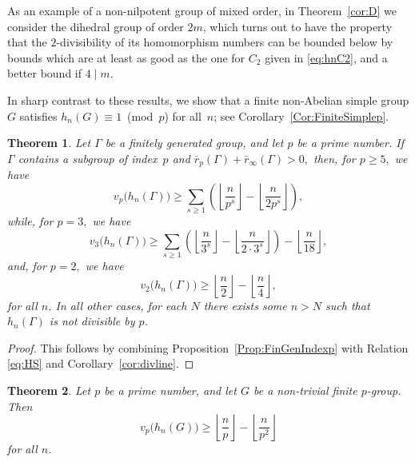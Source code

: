 \documentclass[12pt,reqno]{amsart}
\numberwithin{equation}{section}
\newtheorem{theorem}{Theorem}
\theoremstyle{remark}
\begin{document}
As an example of a non-nilpotent group of mixed order, in
Theorem~\ref{cor:D} we consider the dihedral group of order $2m$,
which turns out to have the property that the $2$-divisibility of
its homomorphism numbers can be bounded below by bounds which are
at least as good as the one for $C_2$ given in \eqref{eq:hnC2},
and a better bound if $4\mid m$.

In sharp contrast to these results, we show that a finite non-Abelian simple
group $G$ satisfies $h_n(G)\equiv 1$~(mod~$p$) for
all~$n$; see Corollary~\ref{Cor:FiniteSimplep}. 

\begin{theorem} \label{thm:fingen}
Let\/ $\Gamma$ be a finitely generated group, and let $p$ be a prime number.
If $\Gamma$ contains a subgroup of index~$p$ and
$\bar{r}_p(\Gamma) + \bar{r}_\infty(\Gamma)
>0,$ then, for $p\ge5,$ we have
\begin{equation} \label{eq:hdivl1}
v_p\big(h_n(\Gamma)\big)\ge 
\sum_{s \ge 1}\left({\left\lfloor{\frac {n} {p^{s}}}\right\rfloor}
-{\left\lfloor{\frac {n} {2p^{s}}}\right\rfloor}\right),
\end{equation}
while, for $p=3,$ we have
\begin{equation} \label{eq:hdivl3}
v_3\big(h_n(\Gamma)\big)\ge 
\sum_{s \ge 1}\left({\left\lfloor{\frac {n} {3^{s}}}\right\rfloor}
-{\left\lfloor{\frac {n} {2\cdot3^{s}}}\right\rfloor}\right)-{\left\lfloor{\frac {n} {18}}\right\rfloor},
\end{equation}
and, for $p=2,$ we have
\begin{equation} \label{eq:hdivl2}
v_2\big(h_n(\Gamma)\big)\ge {\left\lfloor{\frac {n} {2}}\right\rfloor}-{\left\lfloor{\frac {n} {4}}\right\rfloor},
\end{equation}
for all $n$.
In all other cases, for each $N$
there exists some $n>N$ such that $h_n(\Gamma)$ is not divisible by $p$. 
\end{theorem}

\begin{proof}
This follows by combining Proposition~\ref{Prop:FinGenIndexp} with 
Relation \eqref{eq:HS}  
and Corollary~\ref{cor:divline}.
\end{proof}

\begin{theorem} \label{thm:pgroup}
Let $p$ be a prime number, and let $G$ be a non-trivial finite $p$-group.
Then
\begin{equation} \label{eq:hpdiv}
v_p\big(h_n(G)\big)\ge 
{\left\lfloor{\frac {n} {p}}\right\rfloor}
-{\left\lfloor{\frac {n} {p^{2}}}\right\rfloor}
\end{equation}
for all $n$.
\end{theorem}
\end{document}
